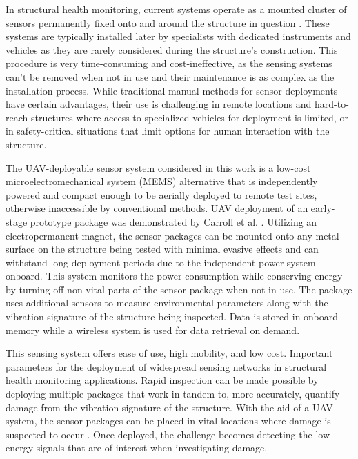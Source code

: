 \documentclass[]{spie}  %
\begin{document}

		In structural health monitoring, current systems operate as a mounted cluster of sensors permanently fixed onto and around the structure in question \cite{Pakzad2008}. These systems are typically installed later by specialists with dedicated instruments and vehicles as they are rarely considered during the structure's construction. This procedure is very time-consuming and cost-ineffective, as the sensing systems can’t be removed when not in use and their maintenance is as complex as the installation process. While traditional manual methods for sensor deployments have certain advantages, their use is challenging in remote locations and hard-to-reach structures where access to specialized vehicles for deployment is limited, or in safety-critical situations that limit options for human interaction with the structure. 

The UAV-deployable sensor system considered in this work is a low-cost microelectromechanical system (MEMS) alternative \cite{Sabato2017} that is independently powered and compact enough to be aerially deployed to remote test sites, otherwise inaccessible by conventional methods. UAV deployment of an early-stage prototype package was demonstrated by Carroll et al. \cite{Carroll2021}. Utilizing an electropermanent magnet, the sensor packages can be mounted onto any metal surface on the structure being tested with minimal evasive effects \cite{Takeuchi2017} and can withstand long deployment periods due to the independent power system onboard. This system monitors the power consumption while conserving energy by turning off non-vital parts of the sensor package when not in use. The package uses additional sensors to measure environmental parameters along with the vibration signature of the structure being inspected. Data is stored in onboard memory while a wireless system is used for data retrieval on demand. 

This sensing system offers ease of use, high mobility, and low cost. Important parameters for the deployment of widespread sensing networks in structural health monitoring applications. Rapid inspection can be made possible by deploying multiple packages that work in tandem to, more accurately, quantify damage from the vibration signature of the structure. With the aid of a UAV system, the sensor packages can be placed in vital locations where damage is suspected to occur \cite{Chen2010}. Once deployed, the challenge becomes detecting the low-energy signals that are of interest when investigating damage. 
\end{document}
